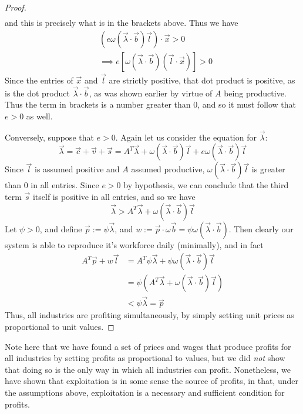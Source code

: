\documentclass{article}
\theoremstyle{definition}
\theoremstyle{plain}
\theoremstyle{theorem}
\begin{document}
\begin{proof}
\begin{align*}
 \end{align*}
and this is precisely what is in the brackets above. Thus we have
\begin{align*}
	& (e\omega(\vec{\lambda}\cdot\vec{b})\vec{l})\cdot\vec{x} > 0 \\
	&\implies e[\omega(\vec{\lambda}\cdot\vec{b})(\vec{l}\cdot\vec{x})] > 0
\end{align*}
Since the entries of $\vec{x}$ and $\vec{l}$ are strictly positive, that dot product is positive, as is the dot product $\vec{\lambda} \cdot \vec{b}$, as was shown earlier by virtue of $A$ being productive. Thus the term in brackets is a number greater than $0$, and so it must follow that $e > 0$ as well. \par 
Conversely, suppose that $e > 0$. Again let us consider the equation for $\vec{\lambda}$:
\[ \vec{\lambda} = \vec{c} + \vec{v} + \vec{s} = A^T\vec{\lambda} + \omega(\vec{\lambda}\cdot\vec{b})\vec{l} + e\omega(\vec{\lambda}\cdot\vec{b})\vec{l} \]
Since $\vec{l}$ is assumed positive and $A$ assumed productive, $\omega(\vec{\lambda}\cdot\vec{b})\vec{l}$ is greater than $0$ in all entries. Since $e > 0$ by hypothesis, we can conclude that the third term $\vec{s}$ itself is positive in all entries, and so we have
\[ \vec{\lambda} > A^T\vec{\lambda} + \omega(\vec{\lambda}\cdot\vec{b})\vec{l} \]
Let $\psi > 0$, and define $\vec{p} := \psi\vec{\lambda}$, and $w := \vec{p}\cdot \omega\vec{b} = \psi\omega(\vec{\lambda}\cdot\vec{b})$. Then clearly our system is able to reproduce it's workforce daily (minimally), and in fact 
\begin{align*}
	A^T\vec{p} + w\vec{l} &= A^T\psi\vec{\lambda} + \psi\omega(\vec{\lambda}\cdot\vec{b})\vec{l} \\
	&= \psi(A^T\vec{\lambda} + \omega(\vec{\lambda}\cdot\vec{b})\vec{l}) \\
	&< \psi\vec{\lambda} = \vec{p}
\end{align*}
Thus, all industries are profiting simultaneously, by simply setting unit prices as proportional to unit values. 
\end{proof}
Note here that we have found a set of prices and wages that produce profits for all industries by setting profits as proportional to values, but we did \textit{not} show that doing so is the only way in which all industries can profit. Nonetheless, we have shown that exploitation is in some sense the source of profits, in that, under the assumptions above, exploitation is a necessary and sufficient condition for profits. \par 
\end{document}
